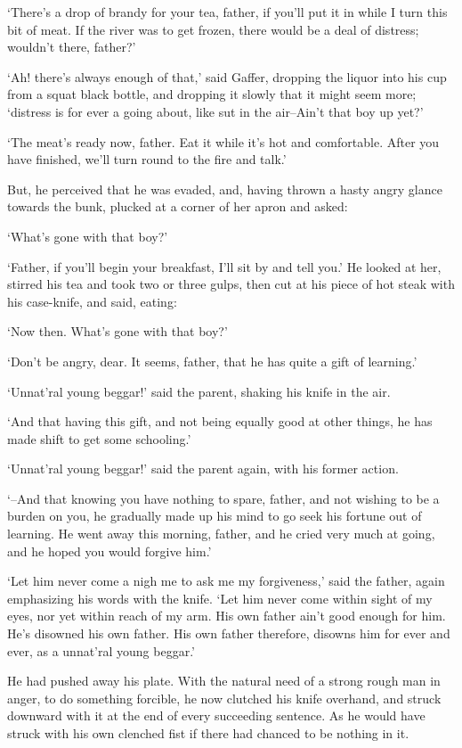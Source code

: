 ‘There’s a drop of brandy for your tea, father, if you’ll put it in
while I turn this bit of meat. If the river was to get frozen, there
would be a deal of distress; wouldn’t there, father?’

‘Ah! there’s always enough of that,’ said Gaffer, dropping the liquor
into his cup from a squat black bottle, and dropping it slowly that it
might seem more; ‘distress is for ever a going about, like sut in the
air--Ain’t that boy up yet?’

‘The meat’s ready now, father. Eat it while it’s hot and comfortable.
After you have finished, we’ll turn round to the fire and talk.’

But, he perceived that he was evaded, and, having thrown a hasty angry
glance towards the bunk, plucked at a corner of her apron and asked:

‘What’s gone with that boy?’

‘Father, if you’ll begin your breakfast, I’ll sit by and tell you.’ He
looked at her, stirred his tea and took two or three gulps, then cut at
his piece of hot steak with his case-knife, and said, eating:

‘Now then. What’s gone with that boy?’

‘Don’t be angry, dear. It seems, father, that he has quite a gift of
learning.’

‘Unnat’ral young beggar!’ said the parent, shaking his knife in the air.

‘And that having this gift, and not being equally good at other things,
he has made shift to get some schooling.’

‘Unnat’ral young beggar!’ said the parent again, with his former action.

‘--And that knowing you have nothing to spare, father, and not wishing
to be a burden on you, he gradually made up his mind to go seek his
fortune out of learning. He went away this morning, father, and he cried
very much at going, and he hoped you would forgive him.’

‘Let him never come a nigh me to ask me my forgiveness,’ said the
father, again emphasizing his words with the knife. ‘Let him never come
within sight of my eyes, nor yet within reach of my arm. His own father
ain’t good enough for him. He’s disowned his own father. His own father
therefore, disowns him for ever and ever, as a unnat’ral young beggar.’

He had pushed away his plate. With the natural need of a strong rough
man in anger, to do something forcible, he now clutched his knife
overhand, and struck downward with it at the end of every succeeding
sentence. As he would have struck with his own clenched fist if there
had chanced to be nothing in it.


